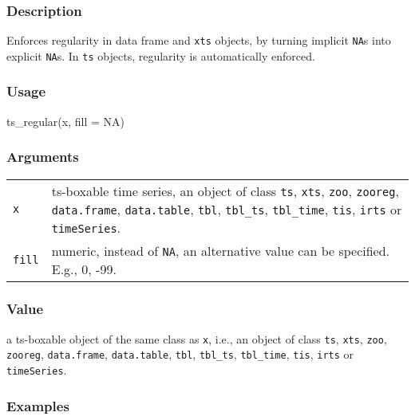 \documentclass[
  letterpaper,
  DIV=11,
  numbers=noendperiod]{scrreport}
\newenvironment{Shaded}{\begin{snugshade}}{\end{snugshade}}
\newcommand{\AttributeTok}[1]{\textcolor[rgb]{0.40,0.45,0.13}{#1}}
\newcommand{\ConstantTok}[1]{\textcolor[rgb]{0.56,0.35,0.01}{#1}}
\newcommand{\FunctionTok}[1]{\textcolor[rgb]{0.28,0.35,0.67}{#1}}
\newcommand{\NormalTok}[1]{\textcolor[rgb]{0.00,0.23,0.31}{#1}}
\begin{document}
\subsubsection{Description}\label{description-10}

Enforces regularity in data frame and \texttt{xts} objects, by turning
implicit \texttt{NA}s into explicit \texttt{NA}s. In \texttt{ts}
objects, regularity is automatically enforced.

\subsubsection{Usage}\label{usage-10}

\begin{Shaded}
\begin{Highlighting}[]
\FunctionTok{ts\_regular}\NormalTok{(x, }\AttributeTok{fill =} \ConstantTok{NA}\NormalTok{)}
\end{Highlighting}
\end{Shaded}

\subsubsection{Arguments}\label{arguments-10}

\begin{longtable}[]{@{}ll@{}}
\toprule\noalign{}
\endhead
\bottomrule\noalign{}
\endlastfoot
\texttt{x} & ts-boxable time series, an object of class \texttt{ts},
\texttt{xts}, \texttt{zoo}, \texttt{zooreg}, \texttt{data.frame},
\texttt{data.table}, \texttt{tbl}, \texttt{tbl\_ts}, \texttt{tbl\_time},
\texttt{tis}, \texttt{irts} or \texttt{timeSeries}. \\
\texttt{fill} & numeric, instead of \texttt{NA}, an alternative value
can be specified. E.g., 0, -99. \\
\end{longtable}

\subsubsection{Value}\label{value-10}

a ts-boxable object of the same class as \texttt{x}, i.e., an object of
class \texttt{ts}, \texttt{xts}, \texttt{zoo}, \texttt{zooreg},
\texttt{data.frame}, \texttt{data.table}, \texttt{tbl},
\texttt{tbl\_ts}, \texttt{tbl\_time}, \texttt{tis}, \texttt{irts} or
\texttt{timeSeries}.

\subsubsection{Examples}\label{examples-10}
\end{document}
